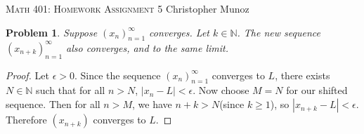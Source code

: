 \documentclass[12pt]{article}
\newtheorem{problem}{Problem}
\newcommand{\NN}{\ensuremath{\mathbb N}}
\newcommand{\eps}{\ensuremath{\epsilon}}
\begin{document}
\small
\noindent \textsc{Math 401: Homework Assignment 5} \hfill Christopher Munoz

\normalsize
\bigskip

\setcounter{problem}{28}

\begin{problem} %
Suppose $(x_n)_{n=1}^\infty$ converges.  Let $k \in \NN$.  The new sequence $(x_{n+k})_{n=1}^\infty$ also converges, and to the same limit.
\end{problem}


\begin{proof}
	Let $\eps > 0$. 
	Since the sequence $(x_n)_{n=1}^\infty$ converges to $L$, there exists $N \in \NN$ such that for all $n > N$, $|x_n - L| < \eps$. Now choose $M = N$ for our shifted sequence. Then for all $n > M$, we have $n+k > N$(since $k \geq 1$), so $|x_{n+k} - L| < \eps$. Therefore $(x_{n+k})$ converges to $L$.
\end{proof}
\end{document}
